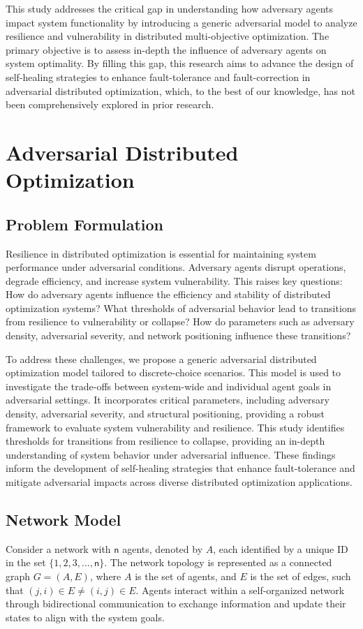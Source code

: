\documentclass[journal]{IEEEtran}
\newcommand{\Agents}{\ensuremath{A }}
\newcommand{\NumAgents}{\ensuremath{\mathsf{n}}}
\begin{document}
This study addresses the critical gap in understanding how adversary agents impact system functionality by introducing a generic adversarial model to analyze resilience and vulnerability in distributed multi-objective optimization. The primary objective is to assess in-depth the influence of adversary agents on system optimality. By filling this gap, this research aims to advance the design of self-healing strategies to enhance fault-tolerance and fault-correction in adversarial distributed optimization, which, to the best of our knowledge, has not been comprehensively explored in prior research.

\section {Adversarial Distributed Optimization} \label{sec3}
\subsection{Problem Formulation}
Resilience in distributed optimization is essential for maintaining system performance under adversarial conditions. Adversary agents disrupt operations, degrade efficiency, and increase system vulnerability. This raises key questions: How do adversary agents influence the efficiency and stability of distributed optimization systems? What thresholds of adversarial behavior lead to transitions from resilience to vulnerability or collapse? How do parameters such as adversary density, adversarial severity, and network positioning influence these transitions?

To address these challenges, we propose a generic adversarial distributed optimization model tailored to discrete-choice scenarios. This model is used to investigate the trade-offs between system-wide and individual agent goals in adversarial settings. It incorporates critical parameters, including adversary density, adversarial severity, and structural positioning, providing a robust framework to evaluate system vulnerability and resilience. This study identifies thresholds for transitions from resilience to collapse, providing an in-depth understanding of system behavior under adversarial influence. These findings inform the development of self-healing strategies that enhance fault-tolerance and mitigate adversarial impacts across diverse distributed optimization applications.

\subsection{Network Model}
Consider a network with \NumAgents{} agents, denoted by \Agents, each identified by a unique ID in the set $\{1,2,3,...,\NumAgents\}$. The network topology is represented as a connected graph $G = (\Agents, E)$, where \Agents{} is the set of agents, and $E$ is the set of edges, such that $(j, i) \in E \neq (i, j) \in E$. Agents interact within a self-organized network through bidirectional communication to exchange information and update their states to align with the system goals.
\end{document}
